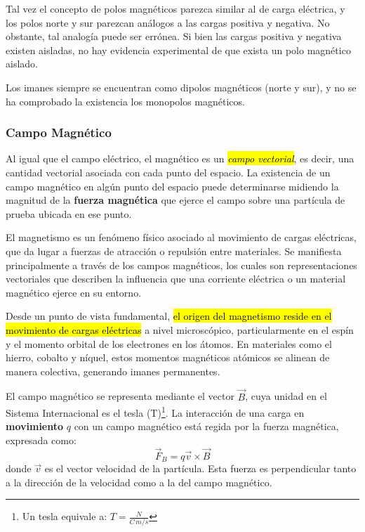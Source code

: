 Tal vez el concepto de polos magnéticos parezca similar al de carga eléctrica, y los polos norte y sur parezcan análogos a las cargas positiva y negativa. No obstante, tal analogía puede ser errónea. Si bien las cargas positiva y negativa existen aisladas, no hay evidencia experimental de que exista un polo magnético aislado.

Los imanes siempre se encuentran como dipolos magnéticos (norte y sur), y no se ha comprobado la existencia los monopolos magnéticos.

\subsubsection{Campo Magnético}

Al igual que el campo eléctrico, el magnético es un \hl{\textit{campo vectorial}}, es decir, una cantidad vectorial asociada con cada punto del espacio. La existencia de un campo magnético en algún punto del espacio puede determinarse midiendo la magnitud de la \textbf{fuerza magnética} que ejerce el campo sobre una partícula de prueba ubicada en ese punto.

El magnetismo es un fenómeno físico asociado al movimiento de cargas eléctricas, que da lugar a fuerzas de atracción o repulsión entre materiales. Se manifiesta principalmente a través de los campos magnéticos, los cuales son representaciones vectoriales que describen la influencia que una corriente eléctrica o un material magnético ejerce en su entorno.

Desde un punto de vista fundamental, \hl{el origen del magnetismo reside en el movimiento de cargas eléctricas} a nivel microscópico, particularmente en el espín y el momento orbital de los electrones en los átomos. En materiales como el hierro, cobalto y níquel, estos momentos magnéticos atómicos se alinean de manera colectiva, generando imanes permanentes.

El campo magnético se representa mediante el vector \(\vec{B}\), cuya unidad en el Sistema Internacional es el tesla (T)\footnote{Un tesla equivale a: \(T=\frac{N}{C\, m/s}\)}. La interacción de una carga en \textbf{movimiento} \(q\) con un campo magnético está regida por la fuerza magnética, expresada como:
\begin{equation}
  \vec{F}_B = q\vec{v} \times \vec{B}
  \label{eq:fuerza_magnética}
\end{equation}
donde \(\vec{v}\) es el vector velocidad de la partícula. Esta fuerza es perpendicular tanto a la dirección de la velocidad como a la del campo magnético.

